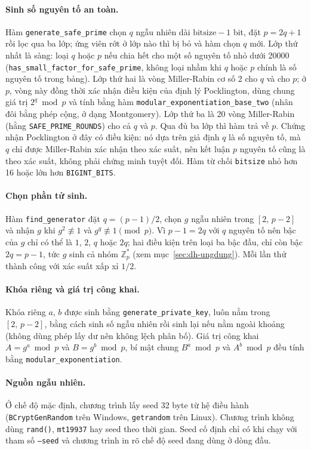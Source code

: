 \paragraph{Sinh số nguyên tố an toàn.}
Hàm \texttt{generate\_safe\_prime} chọn $q$ ngẫu nhiên dài $\text{bitsize}-1$ bit,
đặt $p = 2q+1$ rồi lọc qua ba lớp; ứng viên rớt ở lớp nào thì bị bỏ và hàm chọn
$q$ mới. Lớp thứ nhất là sàng: loại $q$ hoặc $p$ nếu chia hết cho một số nguyên tố
nhỏ dưới 20000 (\texttt{has\_small\_factor\_for\_safe\_prime}, không loại nhầm khi
$q$ hoặc $p$ chính là số nguyên tố trong bảng). Lớp thứ hai là vòng Miller-Rabin cơ
số 2 cho $q$ và cho $p$; ở $p$, vòng này đồng thời xác nhận điều kiện của định lý
Pocklington, dùng chung giá trị $2^q \bmod p$ và tính bằng hàm
\texttt{modular\_exponentiation\_base\_two} (nhân đôi bằng phép cộng, ở dạng
Montgomery). Lớp thứ ba là 20 vòng Miller-Rabin (hằng \texttt{SAFE\_PRIME\_ROUNDS})
cho cả $q$ và $p$. Qua đủ ba lớp thì hàm trả về $p$. Chứng nhận Pocklington ở đây
có điều kiện: nó dựa trên giả định $q$ là số nguyên tố, mà $q$ chỉ được Miller-Rabin
xác nhận theo xác suất, nên kết luận $p$ nguyên tố cũng là theo xác suất, không phải
chứng minh tuyệt đối. Hàm từ chối \texttt{bitsize} nhỏ hơn 16 hoặc lớn hơn
\texttt{BIGINT\_BITS}.

\paragraph{Chọn phần tử sinh.}
Hàm \texttt{find\_generator} đặt $q = (p-1)/2$, chọn $g$ ngẫu nhiên trong
$[2,\,p-2]$ và nhận $g$ khi $g^2 \not\equiv 1$ và $g^q \not\equiv 1 \pmod p$. Vì
$p-1 = 2q$ với $q$ nguyên tố nên bậc của $g$ chỉ có thể là $1$, $2$, $q$ hoặc $2q$;
hai điều kiện trên loại ba bậc đầu, chỉ còn bậc $2q = p-1$, tức $g$ sinh cả nhóm
$\mathbb{Z}_p^*$ (xem mục~\ref{sec:dh-ungdung}). Mỗi lần thử thành công với xác suất
xấp xỉ $1/2$.

\paragraph{Khóa riêng và giá trị công khai.}
Khóa riêng $a$, $b$ được sinh bằng \texttt{generate\_private\_key}, luôn nằm trong
$[2,\,p-2]$, bằng cách sinh số ngẫu nhiên rồi sinh lại nếu nằm ngoài khoảng (không
dùng phép lấy dư nên không lệch phân bố). Giá trị công khai $A = g^a \bmod p$ và
$B = g^b \bmod p$, bí mật chung $B^a \bmod p$ và $A^b \bmod p$ đều tính bằng
\texttt{modular\_exponentiation}.

\paragraph{Nguồn ngẫu nhiên.}
Ở chế độ mặc định, chương trình lấy seed 32 byte từ hệ điều hành
(\texttt{BCryptGenRandom} trên Windows, \texttt{getrandom} trên Linux). Chương trình
không dùng \texttt{rand()}, \texttt{mt19937} hay seed theo thời gian. Seed cố định
chỉ có khi chạy với tham số \texttt{--seed} và chương trình in rõ chế độ seed đang
dùng ở dòng đầu.
